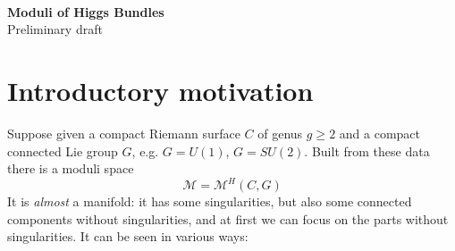 \documentclass[12pt,letterpaper,reqno]{article}
\numberwithin{equation}{section}
\newcommand{\cM}{\ensuremath{\mathcal M}}
\newcommand{\ti}[1]{\textit{#1}}
\begin{document}
\setcounter{page}{1}

{\noindent \tiny \color{gray} \tt \gitAuthorIsoDate \hfill
\gitAbbrevHash}

\begin{center} 
{\textbf {{Moduli of Higgs Bundles}}} \\
Preliminary draft
\end{center}

\tableofcontents
\renewcommand{\listtheoremname}{Quick reference}
\listoftheorems[onlynamed]

\section{Introductory motivation}

Suppose given a compact Riemann surface $C$
of genus $g \ge 2$ and a compact connected 
Lie group $G$, e.g. $G = U(1)$, $G = SU(2)$. 
Built from these data there is a
moduli space $$\cM = \cM^H(C,G)$$
It is \ti{almost} a manifold: it has some singularities, but also
some connected components without singularities, and 
at first we can focus on the parts without singularities.
It can be seen in various ways:
\end{document}
